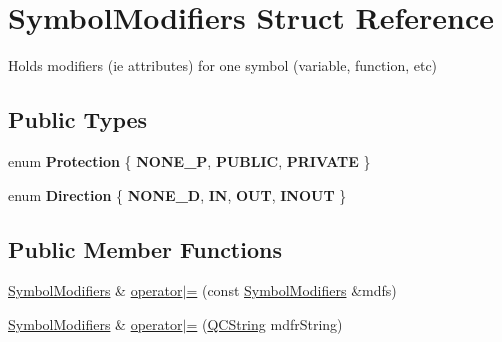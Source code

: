 \hypertarget{struct_symbol_modifiers}{}\section{Symbol\+Modifiers Struct Reference}
\label{struct_symbol_modifiers}


Holds modifiers (ie attributes) for one symbol (variable, function, etc)  


\subsection*{Public Types}
\begin{DoxyCompactItemize}
\item 
\mbox{\label{struct_symbol_modifiers_a6c76745fa39de2b90353729fe62c6708}} 
enum {\bfseries Protection} \{ {\bfseries N\+O\+N\+E\+\_\+P}, 
{\bfseries P\+U\+B\+L\+IC}, 
{\bfseries P\+R\+I\+V\+A\+TE}
 \}
\item 
\mbox{\label{struct_symbol_modifiers_aceec8152eeb6c06b8dbe03ef14fed6a4}} 
enum {\bfseries Direction} \{ {\bfseries N\+O\+N\+E\+\_\+D}, 
{\bfseries IN}, 
{\bfseries O\+UT}, 
{\bfseries I\+N\+O\+UT}
 \}
\end{DoxyCompactItemize}
\subsection*{Public Member Functions}
\begin{DoxyCompactItemize}
\item 
\mbox{\hyperlink{struct_symbol_modifiers}{Symbol\+Modifiers}} \& \mbox{\hyperlink{struct_symbol_modifiers_a73f1b078fd79fffd3a50ca217b580bed}{operator$\vert$=}} (const \mbox{\hyperlink{struct_symbol_modifiers}{Symbol\+Modifiers}} \&mdfs)
\item 
\mbox{\hyperlink{struct_symbol_modifiers}{Symbol\+Modifiers}} \& \mbox{\hyperlink{struct_symbol_modifiers_aaca9d411d0392efd25510ca3209178d0}{operator$\vert$=}} (\mbox{\hyperlink{class_q_c_string}{Q\+C\+String}} mdfr\+String)
\end{DoxyCompactItemize}
